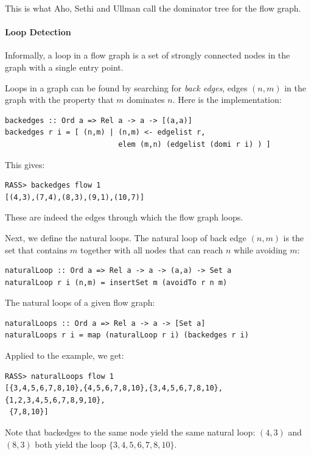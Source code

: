 \documentclass[11pt]{article}
\newlength{\fminilength}
\newenvironment{fminipage}[1][\linewidth]
 {\setlength{\fminilength}{#1-2\fboxsep-2\fboxrule-1em}%
  \bigskip\begin{lrbox}{\fminibox}\quad\begin{minipage}{\fminilength}\bigskip}
 {\smallskip\end{minipage}\end{lrbox}\noindent\fbox{\usebox{\fminibox}}\bigskip}
\newcommand{\bc}{\begin{fminipage}}
\newcommand{\ec}{\end{fminipage}}
\begin{document}
This is what Aho, Sethi and Ullman call the dominator tree for the flow graph. 

\paragraph{Loop Detection}  \mbox{}

Informally, a loop in a flow graph is a set of strongly connected nodes in 
the graph with a single entry point. 

Loops in a graph can be found by searching for {\em back edges}, edges $(n,m)$ 
in the graph with the property that $m$ dominates $n$. Here is the implementation: 

\bc\begin{verbatim} 
backedges :: Ord a => Rel a -> a -> [(a,a)]
backedges r i = [ (n,m) | (n,m) <- edgelist r, 
                          elem (m,n) (edgelist (domi r i) ) ]
\end{verbatim}\ec

This gives: 

\begin{verbatim}
RASS> backedges flow 1
[(4,3),(7,4),(8,3),(9,1),(10,7)]
\end{verbatim}

These are indeed the edges through which the flow graph loops. 

Next, we define the natural loops. The natural loop of back edge $(n,m)$ 
is the set that contains $m$ together with all nodes that can reach $n$ while 
avoiding $m$: 

\bc\begin{verbatim} 
naturalLoop :: Ord a => Rel a -> a -> (a,a) -> Set a
naturalLoop r i (n,m) = insertSet m (avoidTo r n m)
\end{verbatim}\ec

The natural loops of a given flow graph: 

\bc\begin{verbatim}
naturalLoops :: Ord a => Rel a -> a -> [Set a]
naturalLoops r i = map (naturalLoop r i) (backedges r i)
\end{verbatim}\ec

Applied to the example, we get: 

\begin{verbatim}
RASS> naturalLoops flow 1
[{3,4,5,6,7,8,10},{4,5,6,7,8,10},{3,4,5,6,7,8,10},{1,2,3,4,5,6,7,8,9,10},
 {7,8,10}]
\end{verbatim}

Note that backedges to the same node yield the same natural loop: 
$(4,3)$ and $(8,3)$ both yield the loop $\{3,4,5,6,7,8,10\}$. 
\end{document}
